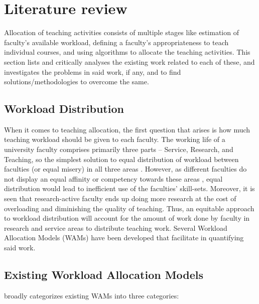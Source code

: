 \chapter{Literature review}

Allocation of teaching activities consists of multiple stages like estimation of faculty's available workload, defining a faculty's appropriateness to teach individual courses, and using algorithms to allocate the teaching activities. This section lists and critically analyses the existing work related to each of these, and investigates the problems in said work, if any, and to find solutions/methodologies to overcome the same.

\section{Workload Distribution}

When it comes to teaching allocation, the first question that arises is how much teaching workload should be given to each faculty. The working life of a university faculty comprises primarily three parts – Service, Research, and Teaching, so the simplest solution to equal distribution of workload between faculties (or equal misery) in all three areas \cite{gray1989university}. However, as different faculties do not display an equal affinity or competency towards these areas \cite{finlay1994management}, equal distribution would lead to inefficient use of the faculties' skill-sets. Moreover, it is seen that research-active faculty ends up doing more research at the cost of overloading and diminishing the quality of teaching. Thus, an equitable approach to workload distribution will account for the amount of work done by faculty in research and service areas to distribute teaching work. Several Workload Allocation Models (WAMs) have been developed that facilitate in quantifying said work.

\section{Existing Workload Allocation Models}

\cite{vardi2009impacts} broadly categorizes existing WAMs into three categories:

